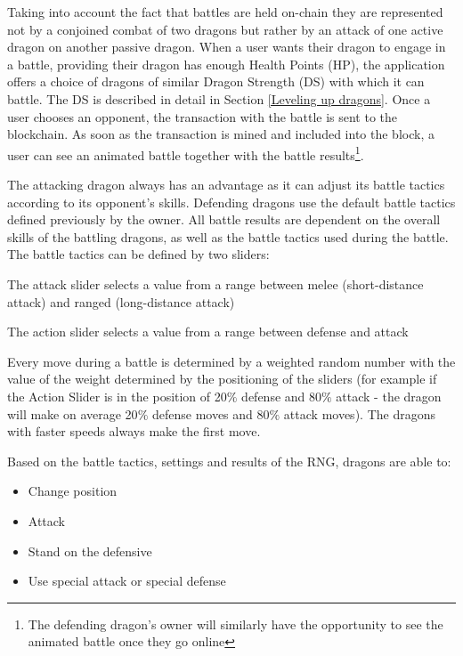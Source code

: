 \documentclass[12pt]{article}
\begin{document}
Taking into account the fact that battles are held on-chain they are represented not by a conjoined combat of two dragons but rather by an attack of one active dragon on another passive dragon. When a user wants their dragon to engage in a battle, providing their dragon has enough Health Points (HP), the application offers a choice of dragons of similar Dragon Strength (DS) with which it can battle. The DS is described in detail in Section \ref{Leveling up dragons}. Once a user chooses an opponent, the transaction with the battle is sent to the blockchain. As soon as the transaction is mined and included into the block, a user can see an animated battle together with the battle results\footnote{The defending dragon’s owner will similarly have the opportunity to see the animated battle once they go online}.\par

The attacking dragon always has an advantage as it can adjust its battle tactics according to its opponent’s skills. Defending dragons use the default battle tactics defined previously by the owner. All battle results are dependent on the overall skills of the battling dragons, as well as the battle tactics used during the battle. The battle tactics can be defined by two sliders:


\begin{itemize}
  \begin{samepage}
    \item The attack slider selects a value from a range between melee (short-distance attack) and ranged (long-distance attack)
    \item The action slider selects a value from a range between defense and attack
   \end{samepage}
\end{itemize}

Every move during a battle is determined by a weighted random number with the value of the weight determined by the positioning of the sliders (for example if the Action Slider is in the position of 20$\%$  defense and 80$\%$  attack - the dragon will make on average 20$\%$  defense moves and 80$\%$  attack moves). The dragons with faster speeds always make the first move.\par

\begin{samepage}
 Based on the battle tactics, settings and results of the RNG, dragons are able to:\par
 \begin{itemize}
    \item Change position
          \item Attack
          \item Stand on the defensive
          \item Use special attack or special defense
  \end{itemize}
\end{samepage}
\end{document}
